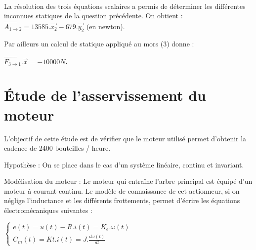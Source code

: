 
~\

La résolution des trois équations scalaires a permis de déterminer les différentes inconnues statiques de la question précédente. On obtient : $\overrightarrow{A_{1\rightarrow2}}=13585.\overrightarrow{x_2}-679.\overrightarrow{y_2}$ (en newton).

Par ailleurs un calcul de statique appliqué au mors (3) donne :

$\overrightarrow{F_{3\rightarrow1}}.\overrightarrow{x}=-10000N$.


\section{Étude de l'asservissement du moteur}

L'objectif de cette étude est de vérifier que le moteur utilisé permet d'obtenir la cadence de 2400 bouteilles / heure.

Hypothèse : On se place dans le cas d'un système linéaire, continu et invariant.

Modélisation du moteur : Le moteur qui entraîne l'arbre principal est équipé d'un moteur à courant continu. Le modèle de connaissance de cet actionneur, si on néglige l'inductance et les différents frottements, permet d'écrire les équations électromécaniques suivantes :

$\left\{\begin{array}{l}
e(t)=u(t)-R.i(t)=K_e.\omega(t) \\
C_m(t)=Kt.i(t)=J.\frac{d\omega(t)}{dt}
\end{array}\right.$

